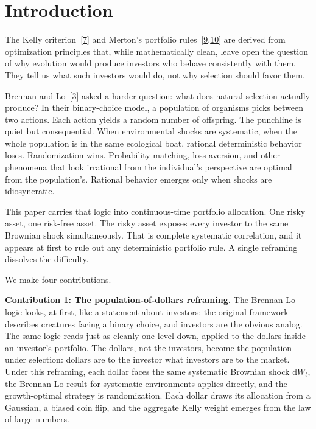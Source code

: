 \documentclass[11pt]{article}
\newcommand{\dd}{\mathrm{d}}
\begin{document}
\newpage
\section{Introduction}

The Kelly criterion~[\hyperlink{ref:7}{7}] and Merton's portfolio rules~[\hyperlink{ref:9}{9},\hyperlink{ref:10}{10}] are
derived from optimization principles that, while mathematically
clean, leave open the question of why evolution would produce
investors who behave consistently with them. They tell us what such
investors would do, not why selection should favor them.

Brennan and Lo~[\hyperlink{ref:3}{3}] asked a harder question: what does natural
selection actually produce? In their binary-choice model, a population
of organisms picks between two actions. Each action yields a random
number of offspring. The punchline is quiet but consequential. When
environmental shocks are systematic, when the whole population is in the same ecological boat, rational deterministic behavior loses.
Randomization wins. Probability matching, loss aversion, and other
phenomena that look irrational from the individual's perspective are
optimal from the population's. Rational behavior emerges only when
shocks are idiosyncratic.

This paper carries that logic into continuous-time portfolio
allocation. One risky asset, one risk-free asset. The risky asset
exposes every investor to the same Brownian shock simultaneously.
That is complete systematic correlation, and it appears at first to
rule out any deterministic portfolio rule. A single reframing
dissolves the difficulty.

We make four contributions.

\textbf{Contribution 1: The population-of-dollars reframing.}
The Brennan-Lo logic looks, at first, like a statement about
investors: the original framework describes creatures facing a binary
choice, and investors are the obvious analog. The same logic reads
just as cleanly one level down, applied to the dollars inside an
investor's portfolio. The dollars, not the investors, become the
population under selection: dollars are to the investor what investors
are to the market. Under this reframing, each dollar faces the same
systematic Brownian shock $\dd W_{t}$, the Brennan-Lo result for
systematic environments applies directly, and the growth-optimal
strategy is randomization. Each dollar draws its allocation from a
Gaussian, a biased coin flip, and the aggregate Kelly weight emerges
from the law of large numbers.
\end{document}
